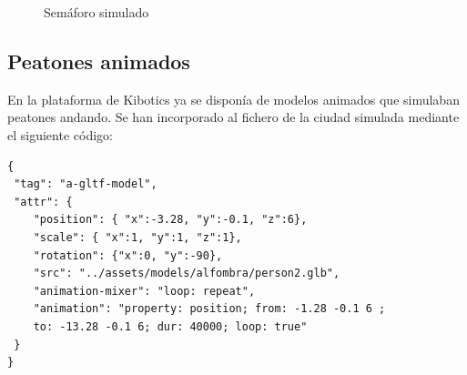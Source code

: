 \documentclass{report}
\begin{document}
\begin{figure}[h]
\begin{subfigure}[b]{0.3\textwidth}
    \label{fig:f2}
  \end{subfigure}
  \caption{Semáforo simulado}
\end{figure}



\subsection{Peatones animados}
En la plataforma de Kibotics ya se disponía de modelos animados que simulaban peatones andando. Se han incorporado al fichero de la ciudad simulada mediante el siguiente código:

\begin{lstlisting}[backgroundcolor = \color{light-gray},
				   aboveskip = 2em,
				   belowskip = 2em,
                   xleftmargin = 2cm,
                   framexleftmargin = 1em,
                   basicstyle=\small]
{
 "tag": "a-gltf-model",
 "attr": {
	"position": { "x":-3.28, "y":-0.1, "z":6},
	"scale": { "x":1, "y":1, "z":1},
	"rotation": {"x":0, "y":-90},
	"src": "../assets/models/alfombra/person2.glb",
	"animation-mixer": "loop: repeat",
	"animation": "property: position; from: -1.28 -0.1 6 ;
	to: -13.28 -0.1 6; dur: 40000; loop: true"
 }
}
\end{lstlisting} 
\end{document}
